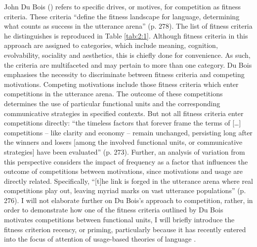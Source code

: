 John Du Bois (\citeyear{dubois2014}) refers to specific drives, or motives, for competition as fitness criteria. These criteria ``define the fitness landscape for language, determining what counts as success in the utterance arena'' (p. 278). The list of fitness criteria he distinguishes is reproduced in Table \ref{tab:2:1}. Although fitness criteria in this approach are assigned to categories, which include meaning, cognition, evolvability, sociality and aesthetics, this is chiefly done for convenience. As such, the criteria are multifaceted and may pertain to more than one category. Du Bois emphasises the necessity to discriminate between fitness criteria and competing motivations. Competing motivations include those fitness criteria which enter competitions in the utterance arena. The outcome of these competitions determines the use of particular functional units and the corresponding communicative strategies in specified contexts. But not all fitness criteria enter competitions directly: ``the timeless factors that forever frame the terms of [\dots] competitions -- like clarity and economy -- remain unchanged, persisting long after the winners and losers [among the involved functional units, or communicative strategies] have been evaluated'' (p. 273). Further, an analysis of variation from this perspective considers the impact of frequency as a factor that influences the outcome of competitions between motivations, since motivations and usage are directly related. Specifically, ``[t]he link is forged in the utterance arena where real competitions play out, leaving myriad marks on vast utterance populations'' (p. 276). I will not elaborate further on Du Bois's approach to competition, rather, in order to demonstrate how one of the fitness criteria outlined by Du Bois motivates competitions between functional units, I will briefly introduce the fitness criterion recency, or priming, particularly because it has recently entered into the focus of attention of usage-based theories of language \citep[cf.][]{gries2005,abramowicz,jaeger-rosenbach,diessel-review,bybee-beckner,torres-cacoullos}.


